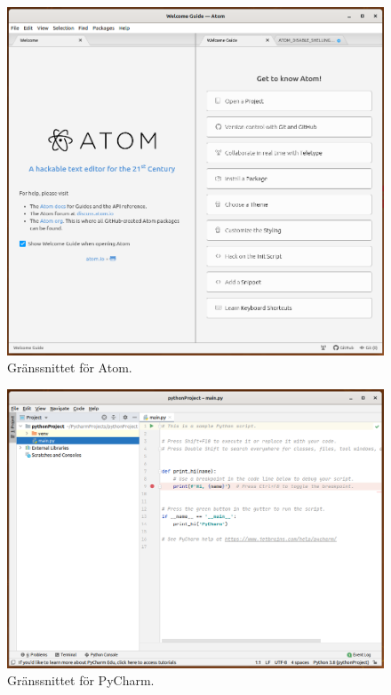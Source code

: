 \begin{frame}
  \begin{figure}
    \centering
    \includegraphics[height=0.8\textheight]{figs/atom.png}
    \caption{Gränssnittet för Atom.}
  \end{figure}
\end{frame}

\begin{frame}
  \begin{figure}
    \centering
    \includegraphics[height=0.8\textheight]{figs/pycharm.png}
    \caption{Gränssnittet för PyCharm.}
  \end{figure}
\end{frame}

